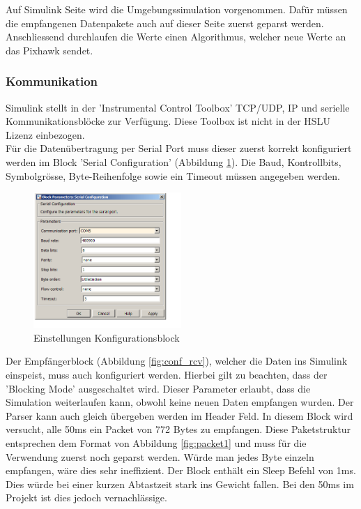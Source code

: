 Auf Simulink Seite wird die Umgebungssimulation vorgenommen. Dafür müssen die empfangenen Datenpakete auch auf dieser Seite zuerst geparst werden. Anschliessend durchlaufen die Werte einen Algorithmus, welcher neue Werte an das Pixhawk sendet.

\subsubsection{Kommunikation}
Simulink stellt in der 'Instrumental Control Toolbox' TCP/UDP, IP und serielle Kommunikationsblöcke zur Verfügung. Diese Toolbox ist nicht in der HSLU Lizenz einbezogen.\\

\noindent Für die Datenübertragung per Serial Port muss dieser zuerst korrekt konfiguriert werden im Block 'Serial Configuration' (Abbildung \ref{fig:conf_conf}). Die Baud, Kontrollbits, Symbolgrösse, Byte-Reihenfolge sowie ein Timeout müssen angegeben werden.\\

\begin{figure}[H]
  \begin{center}
  \includegraphics[width=0.5\textwidth]{pic/60_simulink/conf_conf.png}
  \caption{Einstellungen Konfigurationsblock}
  \label{fig:conf_conf}
  \end{center}
\end{figure}


\noindent Der Empfängerblock (Abbildung \ref{fig:conf_rcv}), welcher die Daten ins Simulink einspeist, muss auch konfiguriert werden. Hierbei gilt zu beachten, dass der 'Blocking Mode' ausgeschaltet wird. Dieser Parameter erlaubt, dass die Simulation weiterlaufen kann, obwohl keine neuen Daten empfangen wurden. Der Parser kann auch gleich übergeben werden im Header Feld. In diesem Block wird versucht, alle 50ms ein Packet von 772 Bytes zu empfangen. Diese Paketstruktur entsprechen dem Format von Abbildung \ref{fig:packet1} und muss für die Verwendung zuerst noch geparst werden. Würde man jedes Byte einzeln empfangen, wäre dies sehr ineffizient. Der Block enthält ein Sleep Befehl von 1ms. Dies würde bei einer kurzen Abtastzeit stark ins Gewicht fallen. Bei den 50ms im Projekt ist dies jedoch vernachlässige.\\


